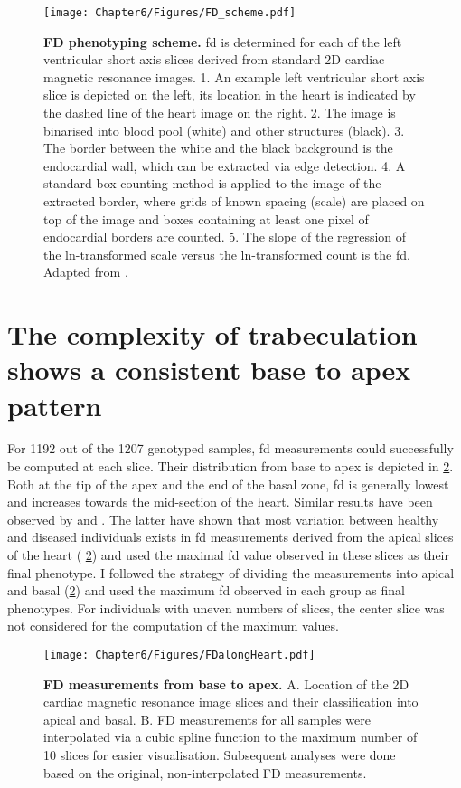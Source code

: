 \begin{figure}[hbtp]
	\centering
	\texttt{[image: Chapter6/Figures/FD\_scheme.pdf]}
	\caption[\textbf{FD phenotyping scheme. }]{\textbf{FD phenotyping scheme. }\gls{fd} is determined for each of the left ventricular short axis slices derived from standard 2D cardiac magnetic resonance images. 1. An example left ventricular short axis slice is depicted on the left, its location in the heart is indicated by the dashed line of the heart image on the right. 2. The image is binarised into blood pool (white) and other structures (black). 3. The border between the white and the black background is the endocardial wall, which can be extracted via edge detection. 4. A standard box-counting method is applied to the image of the extracted border, where grids of known spacing (scale) are placed on top of the image and boxes containing at least one pixel of endocardial borders are counted. 5. The slope of the regression of the ln-transformed scale versus the ln-transformed count is the \gls{fd}. Adapted from \citep{Captur2013}.} 
	 	\label{fig:scheme-fd}
\end{figure}

\section{The complexity of trabeculation shows a consistent base to apex pattern}
For \num{1192} out of the \num{1207} genotyped samples, \gls{fd} measurements could successfully be computed at each slice. Their distribution from base to apex is depicted in \cref{fig:perslice-fd}. Both at the tip of the apex and the end of the basal zone, \gls{fd} is generally lowest and increases towards the mid-section of the heart. Similar results have been observed by \citep{Kawel2012} and \citep{Captur2014}. The latter have shown that most variation between healthy and diseased individuals exists in \gls{fd} measurements derived from the apical slices of the heart ( \cref{fig:perslice-fd}) and used the maximal \gls{fd} value observed in these slices as their final phenotype. I followed the strategy of dividing the measurements into apical and basal (\cref{fig:perslice-fd}) and used the maximum \gls{fd} observed in each group as final phenotypes. For individuals with uneven numbers of slices, the center slice was not considered for the computation of the maximum values.
\\
\begin{figure}[hbtp]
	\centering
	\texttt{[image: Chapter6/Figures/FDalongHeart.pdf]}
	\caption[\textbf{FD measurements from base to apex. }]{\textbf{FD measurements from base to apex. } A. Location of the 2D cardiac magnetic resonance image slices and their classification into apical and basal. B. FD measurements for all samples were interpolated via a cubic spline function to the maximum number of \num{10} slices for easier visualisation. Subsequent analyses were done based on the original, non-interpolated FD measurements.} 
	 	\label{fig:perslice-fd}
\end{figure}

